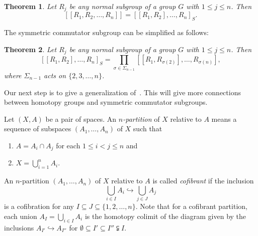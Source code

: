 \documentclass[10pt]{amsart}
\newtheorem{thm}{Theorem}[section]
\numberwithin{equation}{section}
\begin{document}
\begin{thm}\label{theorem1.1}
Let $R_j$ be any normal subgroup of a group $G$ with $1\leq j\leq n$. Then
$$
[[R_1,R_2,\ldots,R_n]]=[[R_1,R_2],\ldots,R_n]_S.
$$
\end{thm}

The symmetric commutator subgroup can be simplified as follows:

\begin{thm}\label{theorem1.2}
Let $R_j$ be any normal subgroup of a group $G$ with $1\leq j\leq n$. Then
$$
[[R_1,R_2],\ldots,R_n]_S=\prod_{\sigma\in \Sigma_{n-1}}[[R_{1},R_{\sigma(2)}],\ldots,R_{\sigma(n)}],
$$
where $\Sigma_{n-1}$ acts on $\{2,3,\ldots,n\}$.
\end{thm}

Our next step is to give a generalization of~\cite[Theorem 1.7]{Wu1}. This will give more connections between homotopy groups and symmetric commutator subgroups.

Let $(X,A)$ be a pair of spaces. An  \textit{$n$-partition} of $X$ relative to $A$ means a sequence of subspaces $(A_1,\ldots,A_n)$ of $X$ such that
\begin{enumerate}
\item $A=A_i\cap A_j$ for each $1\leq i<j\leq n$ and
\item $X=\bigcup\limits_{i=1}^n A_i$.
\end{enumerate}
An $n$-partition $(A_1,\ldots,A_n)$ of $X$ relative to $A$ is called \textit{cofibrant} if the inclusion
$$
\bigcup_{i\in I}A_i \hookrightarrow \bigcup_{j\in J}A_j
$$
is a cofibration for any $I\subseteq J\subseteq\{1,2,\ldots,n\}$. Note that for a cofibrant partition, each union $A_I=\bigcup_{i\in I}A_i$ is the homotopy colimit of the diagram given by the inclusions $A_{I'}\hookrightarrow A_{I''}$ for $\emptyset\subseteq I'\subseteq I''\subsetneqq I$.
\end{document}

